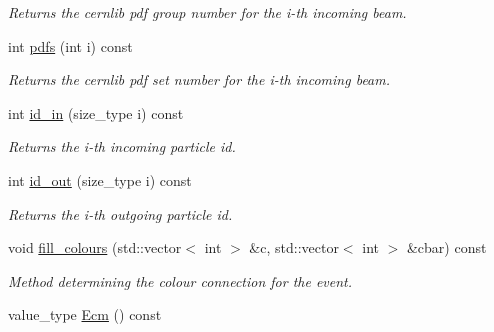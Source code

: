 \begin{DoxyCompactItemize}
\begin{DoxyCompactList}\small\item\em Returns the cernlib pdf group number for the i-\/th incoming beam. \end{DoxyCompactList}\item 
\hypertarget{a00210_a2ca5e23a439422f77d49981a09072dee}{int \hyperlink{a00210_a2ca5e23a439422f77d49981a09072dee}{pdfs} (int i) const }\label{a00210_a2ca5e23a439422f77d49981a09072dee}

\begin{DoxyCompactList}\small\item\em Returns the cernlib pdf set number for the i-\/th incoming beam. \end{DoxyCompactList}\item 
\hypertarget{a00210_ad7eb70375dff438f73ebc5f79919279a}{int \hyperlink{a00210_ad7eb70375dff438f73ebc5f79919279a}{id\-\_\-in} (size\-\_\-type i) const }\label{a00210_ad7eb70375dff438f73ebc5f79919279a}

\begin{DoxyCompactList}\small\item\em Returns the i-\/th incoming particle id. \end{DoxyCompactList}\item 
\hypertarget{a00210_aaa6968384f596478f21840491ceabad4}{int \hyperlink{a00210_aaa6968384f596478f21840491ceabad4}{id\-\_\-out} (size\-\_\-type i) const }\label{a00210_aaa6968384f596478f21840491ceabad4}

\begin{DoxyCompactList}\small\item\em Returns the i-\/th outgoing particle id. \end{DoxyCompactList}\item 
\hypertarget{a00210_ab6c23b5b397048e7900ea14cc07f45fc}{void \hyperlink{a00210_ab6c23b5b397048e7900ea14cc07f45fc}{fill\-\_\-colours} (std\-::vector$<$ int $>$ \&c, std\-::vector$<$ int $>$ \&cbar) const }\label{a00210_ab6c23b5b397048e7900ea14cc07f45fc}

\begin{DoxyCompactList}\small\item\em Method determining the colour connection for the event. \end{DoxyCompactList}\item 
\hypertarget{a00210_ad7d0811b50df49cd86bedbcc79f05e6f}{value\-\_\-type \hyperlink{a00210_ad7d0811b50df49cd86bedbcc79f05e6f}{Ecm} () const }\label{a00210_ad7d0811b50df49cd86bedbcc79f05e6f}


\end{DoxyCompactItemize}
